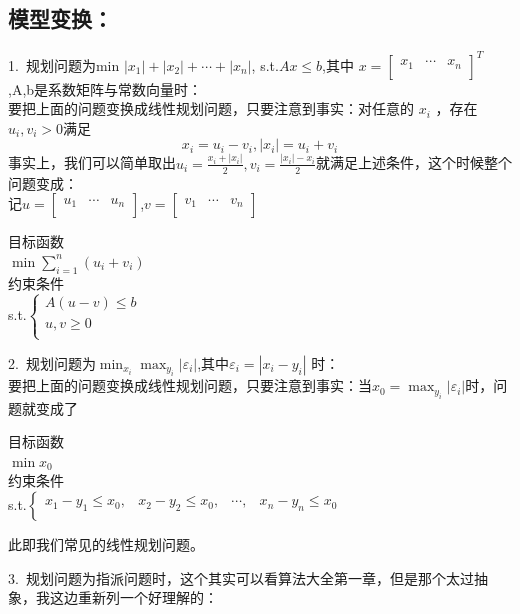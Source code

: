 \documentclass[a4paper,20pt]{article}
\begin{document}
    \subsection{模型变换：}
    1.~规划问题为min $|x_1|+|x_2|+\cdots+|x_n|$,  s.t.$ Ax\leq b$,其中
$x={\begin{bmatrix}
    x_1 & \cdots & x_n \\
\end{bmatrix}}^T$
    ,A,b是系数矩阵与常数向量时：
    \\要把上面的问题变换成线性规划问题，只要注意到事实：对任意的 $x_i$ ，存在$
u_i , v_i > 0$满足
$$x_i=u_i-v_i,|x_i|=u_i+v_i$$
事实上，我们可以简单取出$u_i=\frac{x_i+|x_i|}{2},v_i=\frac{|x_i|-x_i}{2}$就满足上述条件，这个时候整个问题变成：
\\记$u=\begin{bmatrix}
        u_1 & \cdots & u_n \\
    \end{bmatrix}$,$v=\begin{bmatrix}
        v_1 & \cdots & v_n \\
    \end{bmatrix}$
\begin{center}

    目标函数\\ $\min \sum_{i=1}^{n}(u_i+v_i)$
    \\约束条件
    \\s.t.$\left\{\begin{matrix}
            A(u-v)\leq b \\
            u,v \geq 0   \\
        \end{matrix}\right.$
\end{center}
\par 2.~规划问题为$\min_{x_i}{\max_{y_i}|\varepsilon_i|}$,其中$\varepsilon_i=|x_i-y_i|$ 时：
\\ 要把上面的问题变换成线性规划问题，只要注意到事实：当$x_0=\max_{y_i}|\varepsilon_i|$时，问题就变成了
\begin{center}
    目标函数\\ $\min x_0$
    \\约束条件
    \\s.t.$\left\{\begin{matrix}
            x_1-y_1\leq x_0 , & x_2-y_2\leq x_0, & \cdots , & x_n-y_n\leq x_0 \\
        \end{matrix}\right.$
\end{center}此即我们常见的线性规划问题。
\par 3.~规划问题为指派问题时，这个其实可以看算法大全第一章，但是那个太过抽象，我这边重新列一个好理解的：
\end{document}
